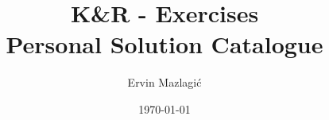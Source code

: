 \documentclass[10pt,a4paper]{article}
\author{Ervin Mazlagi\'c}
\date{\today}
\title{K\&R - Exercises \\ \footnotesize{Personal Solution Catalogue}}
\begin{document}
	\maketitle
	\vfill{}
	
	\vfill{}
	\clearpage
	
	\tableofcontents
	\clearpage

	
	
\end{document}
